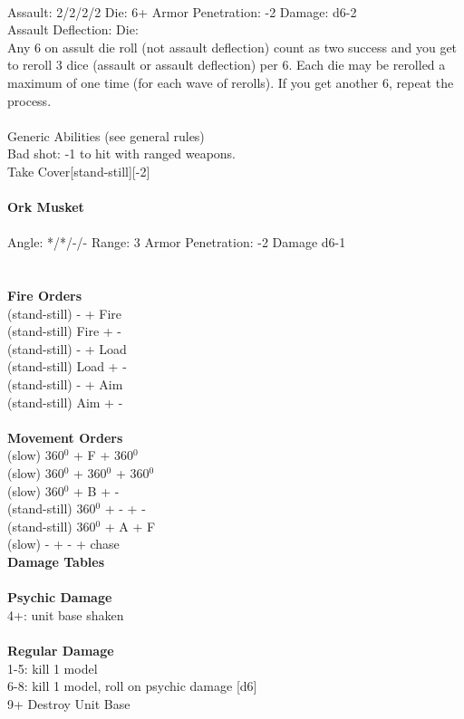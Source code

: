 \ \\
Assault: 2/2/2/2 Die: 6+ Armor Penetration: -2 Damage: d6-2 \\
Assault Deflection:  Die: \\
\indent Any 6 on assult die roll (not assault deflection) count as two success and you get to reroll 3 dice (assault or assault deflection) per 6. Each die may be rerolled a maximum of one time (for each wave of rerolls). If you get another 6, repeat the process.  \\
\ \\
Generic Abilities (see general rules) \\Bad shot: -1 to hit with ranged weapons. \\ Take Cover[stand-still][-2]
\ \\
\ \\
{\bf Ork Musket } \\
\ \\
Angle: */*/-/- Range: 3 Armor Penetration: -2 Damage d6-1 \\
\indent  \\





\ \\ {\bf Fire Orders } \\
(stand-still) - + Fire \\
(stand-still) Fire + -  \\
(stand-still) - + Load \\
(stand-still) Load + - \\
(stand-still) - + Aim \\
(stand-still) Aim + -  \\
\ \\ {\bf Movement Orders } \\
(slow) 360$^0$ + F + 360$^0$ \\
(slow) 360$^0$ + 360$^0$ + 360$^0$ \\
(slow) 360$^0$ + B + - \\
(stand-still) 360$^0$ + - + - \\
(stand-still) 360$^0$ + A + F \\
(slow) - + - + chase \\



{\bf Damage Tables} \\
\ \\ {\bf Psychic Damage } \\
4+: unit base shaken \\
\ \\ {\bf Regular Damage } \\
1-5: kill 1 model \\
6-8: kill 1 model, roll on psychic damage [d6] \\
9+ Destroy Unit Base \\


